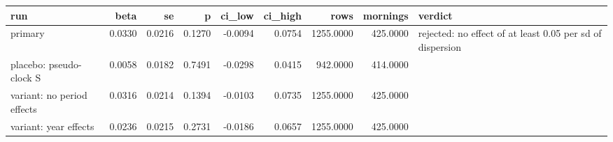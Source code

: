 \begin{tabular}{lrrrrrrrl}
\toprule
run & beta & se & p & ci_low & ci_high & rows & mornings & verdict \\
\midrule
primary & 0.0330 & 0.0216 & 0.1270 & -0.0094 & 0.0754 & 1255.0000 & 425.0000 & rejected: no effect of at least 0.05 per sd of dispersion \\
placebo: pseudo-clock S & 0.0058 & 0.0182 & 0.7491 & -0.0298 & 0.0415 & 942.0000 & 414.0000 &  \\
variant: no period effects & 0.0316 & 0.0214 & 0.1394 & -0.0103 & 0.0735 & 1255.0000 & 425.0000 &  \\
variant: year effects & 0.0236 & 0.0215 & 0.2731 & -0.0186 & 0.0657 & 1255.0000 & 425.0000 &  \\
\bottomrule
\end{tabular}

